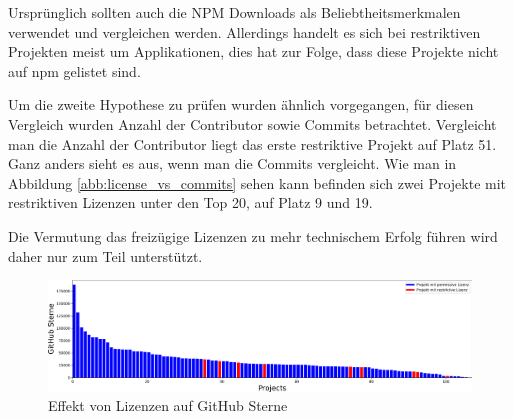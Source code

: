 

Ursprünglich sollten auch die NPM Downloads als Beliebtheitsmerkmalen verwendet und vergleichen
werden. Allerdings handelt es sich bei restriktiven Projekten meist um Applikationen, dies hat zur
Folge, dass diese Projekte nicht auf npm gelistet sind.  %



\bigskip
\noindent
Um die zweite Hypothese zu prüfen wurden ähnlich vorgegangen, für diesen Vergleich wurden Anzahl der
Contributor sowie Commits betrachtet. Vergleicht man die Anzahl der Contributor liegt das erste
restriktive Projekt auf Platz 51. Ganz anders sieht es aus, wenn man die Commits vergleicht.
Wie man in Abbildung \ref{abb:license_vs_commits} sehen kann befinden sich zwei Projekte mit
restriktiven Lizenzen unter den Top 20, auf Platz 9 und 19.

Die Vermutung das freizügige Lizenzen zu mehr technischem Erfolg führen wird daher nur zum Teil
unterstützt. 







\begin{figure}[]
    \centering
    \includegraphics[scale=0.4]{figures/05/permissive_vs_restrictive_asBarChart.png}
    \caption{Effekt von Lizenzen auf GitHub Sterne}
    \label{abb:permissive_vs_restriktiv_BarChart}
\end{figure}

